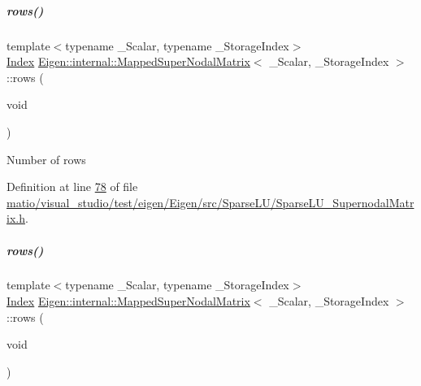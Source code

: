 \mbox{\label{group___sparse_l_u___module_a5cc8f3887a09bd7d078a6744c158b5a0}} 
\subparagraph{\texorpdfstring{rows()}{rows()}\hspace{0.1cm}{\footnotesize\ttfamily [1/2]}}
{\footnotesize\ttfamily template$<$typename \+\_\+\+Scalar, typename \+\_\+\+Storage\+Index$>$ \\
\hyperlink{namespace_eigen_a62e77e0933482dafde8fe197d9a2cfde}{Index} \hyperlink{group___sparse_l_u___module_class_eigen_1_1internal_1_1_mapped_super_nodal_matrix}{Eigen\+::internal\+::\+Mapped\+Super\+Nodal\+Matrix}$<$ \+\_\+\+Scalar, \+\_\+\+Storage\+Index $>$\+::rows (\begin{DoxyParamCaption}\item[{void}]{ }\end{DoxyParamCaption})\hspace{0.3cm}{\ttfamily [inline]}}

Number of rows 

Definition at line \hyperlink{matio_2visual__studio_2test_2eigen_2_eigen_2src_2_sparse_l_u_2_sparse_l_u___supernodal_matrix_8h_source_l00078}{78} of file \hyperlink{matio_2visual__studio_2test_2eigen_2_eigen_2src_2_sparse_l_u_2_sparse_l_u___supernodal_matrix_8h_source}{matio/visual\+\_\+studio/test/eigen/\+Eigen/src/\+Sparse\+L\+U/\+Sparse\+L\+U\+\_\+\+Supernodal\+Matrix.\+h}.

\mbox{\label{group___sparse_l_u___module_a5cc8f3887a09bd7d078a6744c158b5a0}} 
\subparagraph{\texorpdfstring{rows()}{rows()}\hspace{0.1cm}{\footnotesize\ttfamily [2/2]}}
{\footnotesize\ttfamily template$<$typename \+\_\+\+Scalar, typename \+\_\+\+Storage\+Index$>$ \\
\hyperlink{namespace_eigen_a62e77e0933482dafde8fe197d9a2cfde}{Index} \hyperlink{group___sparse_l_u___module_class_eigen_1_1internal_1_1_mapped_super_nodal_matrix}{Eigen\+::internal\+::\+Mapped\+Super\+Nodal\+Matrix}$<$ \+\_\+\+Scalar, \+\_\+\+Storage\+Index $>$\+::rows (\begin{DoxyParamCaption}\item[{void}]{ }\end{DoxyParamCaption})\hspace{0.3cm}{\ttfamily [inline]}}

